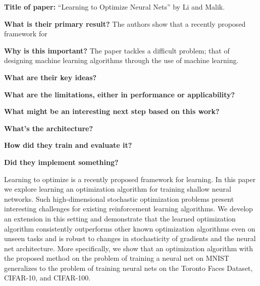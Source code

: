 \noindent \textbf{Title of paper:} ``Learning to Optimize
Neural Nets'' by Li and Malik.

\noindent\textbf{What is their primary result?} The authors
show that a recently proposed framework for

\noindent\textbf{Why is this important?} The paper tackles a difficult
problem; that of designing machine learning algorithms through the use
of machine learning.

\noindent\textbf{What are their key ideas?}

\noindent\textbf{What are the limitations, either in performance or applicability?}

\noindent\textbf{What might be an interesting next step based on this work?}

\noindent\textbf{What's the architecture?}

\noindent\textbf{How did they train and evaluate it?}

\noindent\textbf{Did they implement something?}

Learning to optimize is a recently proposed framework for learning. In
this paper we explore learning an optimization algorithm for training
shallow neural networks. Such high-dimensional stochastic optimization
problems present interesting challenges for existing reinforcement
learning algorithms. We develop an extension in this setting and
demonstrate that the learned optimization algorithm consistently
outperforms other known optimization algorithms even on unseen tasks
and is robust to changes in stochasticity of gradients and the neural
net architecture. More specifically, we show that an optimization
algorithm with the proposed method on the problem of training a neural
net on MNIST generalizes to the problem of training neural nets on the
Toronto Faces Dataset, CIFAR-10, and CIFAR-100.

